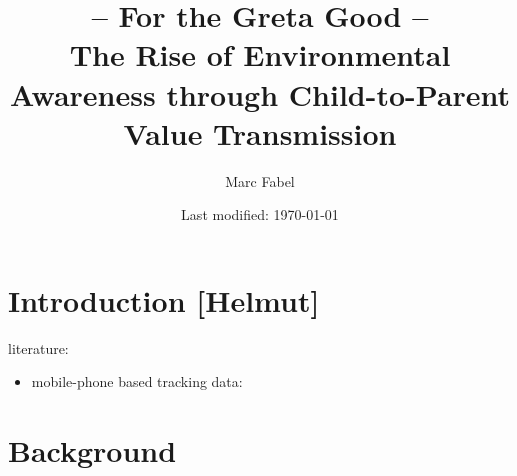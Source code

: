 \documentclass[11pt, a4paper]{article} %
\title{– For the Greta Good –\\The Rise of Environmental Awareness
	through Child-to-Parent Value Transmission}
\author{Marc Fabel}
\date{Last modified: \today}
\begin{document}
\setcounter{page}{0}  
\newpage
\setcounter{page}{1}    
\maketitle



\bigskip
\tableofcontents

\newpage


\section{Introduction [Helmut]}\label{sec_greta_cons:introduction}




literature: 
\begin{itemize}
	\item mobile-phone based tracking data: \cite{dave2020contagion}
\end{itemize}



\bigskip
\section{Background}\label{sec_greta_cons:background}
\end{document}
